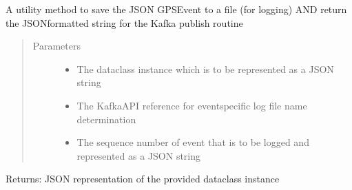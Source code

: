 \documentclass[letterpaper,10pt,english]{sphinxmanual}
\begin{document}
\begin{fulllineitems}
\label{\detokenize{Forge:Forge.json_repr}}
\sphinxAtStartPar
A utility method to save the JSON GPSEvent to a file (for logging) AND return the JSON\sphinxhyphen{}formatted string for the
Kafka publish routine
\begin{quote}\begin{description}
\item[{Parameters}] \leavevmode\begin{itemize}
\item {} 
\sphinxAtStartPar
{} \textendash{} The dataclass instance which is to be represented as a JSON string

\item {} 
\sphinxAtStartPar
{} \textendash{} The KafkaAPI reference for event\sphinxhyphen{}specific log file name determination

\item {} 
\sphinxAtStartPar
{} \textendash{} The sequence number of event that is to be logged and represented as a JSON string

\end{itemize}

\end{description}\end{quote}

\sphinxAtStartPar
Returns: JSON representation of the provided dataclass instance

\end{fulllineitems}

\end{document}
